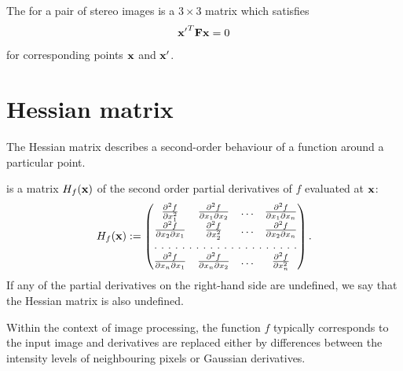 \begin{definition}
The  for a pair of stereo images is a $3 \times 3$ matrix which satisfies 
\begin{align*}
\mathbf{x'}^T \mathbf{F} \mathbf{x} = 0
\end{align*}
for corresponding points $\mathbf{x}$ and $\mathbf{x'}$.
\end{definition}

\section{Hessian matrix}

The Hessian matrix describes a second-order behaviour of a function around a particular point. 

\begin{definition} 
 is a matrix $H_f(\mathbf{x})$ of the second order partial derivatives of $f$ evaluated at $\mathbf{x}$: %
\begin{align*} 
H_f(\x) := 
\begin{pmatrix} 
\fpp{ \partial x_1^2 }              &   \fpp{ \partial x_1 \partial x_2 }   &   \ldots   &   \fpp{ \partial x_1 \partial x_n }   \\ 
\fpp{ \partial x_2 \partial x_1 }   &   \fpp{ \partial x_2^2 }              &   \ldots   &   \fpp{ \partial x_2 \partial x_n }   \\ 
\hdotsfor[2]{4} \\ 
\fpp{ \partial x_n \partial x_1 }   &   \fpp{ \partial x_n \partial x_2 }   &   \ldots   &   \fpp{ \partial x_n^2 }  
\end{pmatrix}. 
\end{align*} 
If any of the partial derivatives on the right-hand side are undefined, we say that the Hessian matrix is also undefined.
% 
\end{definition} 
Within the context of image processing, the function $f$ typically corresponds to the input image and derivatives are replaced either by differences between the intensity levels of neighbouring pixels or Gaussian derivatives. 

